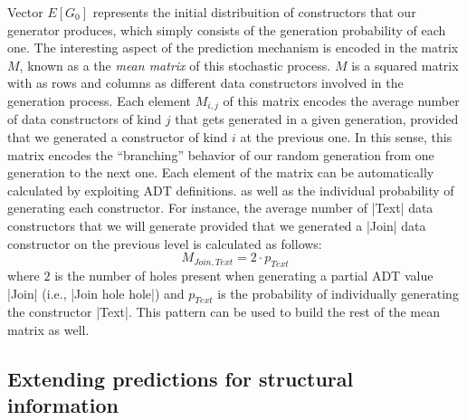 Vector $E[G_0]$ represents the initial distribuition of constructors that our
generator produces, which simply consists of the generation probability of each
one.
%
The interesting aspect of the prediction mechanism is encoded in the matrix $M$,
known as a the \emph{mean matrix} of this stochastic process.
%
$M$ is a squared matrix with as rows and columns as different data constructors
involved in the generation process.
%
Each element $M_{i,j}$ of this matrix encodes the average number of data
constructors of kind $j$ that gets generated in a given generation, provided that we
generated a constructor of kind $i$ at the previous one.
%
In this sense, this matrix encodes the ``branching'' behavior of our random
generation from one generation to the next one.
%
Each element of the matrix can be automatically calculated by exploiting ADT
definitions. %
%
%
as well as the individual probability of generating each constructor.
%
For instance, the average number of |Text| data constructors that we will
generate provided that we generated a |Join| data constructor on the previous
level is calculated as follows:
%
$$ M_{Join, Text} = 2\cdot p_{Text} $$
%
where $2$ is the number of holes present when generating a partial ADT value
|Join| (i.e., |Join hole hole|) and $p_{Text}$ is the probability of
individually generating the constructor |Text|.
%
This pattern can be used to build the rest of the mean matrix as well.



\subsection{Extending predictions for structural information}

